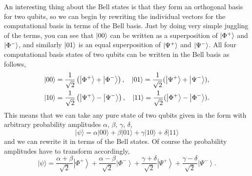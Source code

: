 An interesting thing about the Bell states is that they form an orthogonal basis for two qubits, so we can begin by rewriting the individual vectors for the computational basis in terms of the Bell basis. Just by doing very simple juggling of the terms, you can see that $\left| 00 \right\rangle$ can be written as a superposition of $\left| \Phi^+ \right\rangle$ and $\left| \Phi^- \right\rangle$, and similarly $\left| 01 \right\rangle$ is an equal superposition of $\left| \Psi^+ \right\rangle$ and $\left| \Psi^- \right\rangle$.
All four computational basis states of two qubits can be written in the Bell basis as follows,
\begin{equation}
\begin{aligned}
|00\rangle &=\frac{1}{\sqrt{2}}\left(\left|\Phi^{+}\right\rangle+\left|\Phi^{-}\right\rangle\right), & 
\left| 01 \right\rangle = \frac{1}{\sqrt2}(\left| \Psi^{+} \right\rangle + \left| \Psi^{-} \right\rangle), \\
|10\rangle &=\frac{1}{\sqrt{2}}\left(\left|\Psi^{+}\right\rangle-\left|\Psi^{-}\right\rangle\right), & 
\left| 11 \right\rangle = \frac{1}{\sqrt2}(\left| \Phi^{+} \right\rangle - \left| \Phi^{-} \right\rangle).
\end{aligned}
\end{equation}
This means that we can take any pure state of two qubits given in the form with arbitrary probability amplitudes $\alpha$, $\beta$, $\gamma$, $\delta$,
\begin{equation}
|\psi\rangle=\alpha|00\rangle+\beta|01\rangle+\gamma|10\rangle+\delta|11\rangle
\end{equation}
and we can rewrite it in terms of the Bell states.  Of course the probability amplitudes have to transform accordingly,
\begin{equation}
|\psi\rangle=\frac{\alpha+\beta}{\sqrt{2}}\left|\Phi^{+}\right\rangle+\frac{\alpha-\beta}{\sqrt{2}}\left|\Phi^{-}\right\rangle+\frac{\gamma+\delta}{\sqrt{2}}\left|\Psi^{+}\right\rangle+\frac{\gamma-\delta}{\sqrt{2}}\left|\Psi^{-}\right\rangle.
\end{equation}

